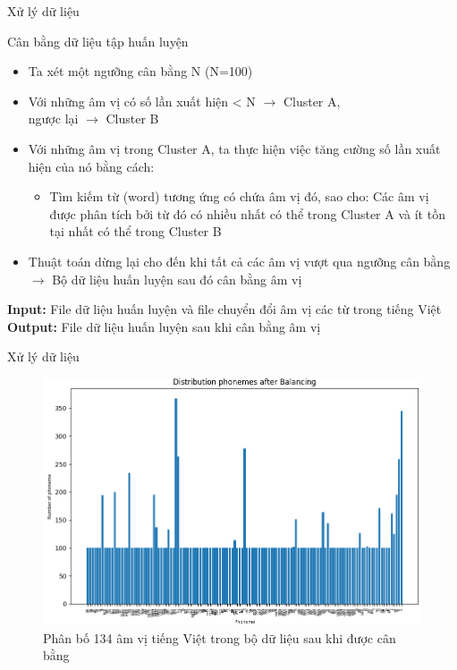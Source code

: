 \documentclass[10pt,a4paper,openany]{beamer}
\begin{document}
	\begin{frame}{Xử lý dữ liệu}
		\begin{block}{Cân bằng dữ liệu tập huấn luyện} \pause
			\begin{itemize}
				\item Ta xét một ngưỡng cân bằng N (N=100) \pause
				\item Với những âm vị có số lần xuất hiện < N $\rightarrow$ Cluster A, \\ngược lại $\rightarrow$ Cluster B \pause
				\item Với những âm vị trong Cluster A, ta thực hiện việc tăng cường số lần xuất hiện của nó bằng cách:  \pause
				\begin{itemize}
					\item Tìm kiếm từ (word) tương ứng có chứa âm vị đó, sao cho: Các âm vị được phân tích bởi từ đó có nhiều nhất có thể trong Cluster A và ít tồn tại nhất có thể trong Cluster B \pause
				\end{itemize}
				\item Thuật toán dừng lại cho đến khi tất cả các âm vị vượt qua ngưỡng cân bằng $\rightarrow$ Bộ dữ liệu huấn luyện sau đó cân bằng âm vị \pause
			\end{itemize}
		\end{block}
		\textbf{Input:} File dữ liệu huấn luyện và file chuyển đổi âm vị các từ trong tiếng Việt\\ \pause
		\textbf{Output:} File dữ liệu huấn luyện sau khi cân bằng âm vị
	\end{frame}
	
	\begin{frame}{Xử lý dữ liệu}
		\begin{figure}[htbp]
			\centerline{\includegraphics[scale=0.31]{charts/distribution_after.jpg}}
			\caption{Phân bố 134 âm vị tiếng Việt trong bộ dữ liệu sau khi được cân bằng}
			\label{fig_distribution_after}
		\end{figure}
	\end{frame}
	
\end{document}
